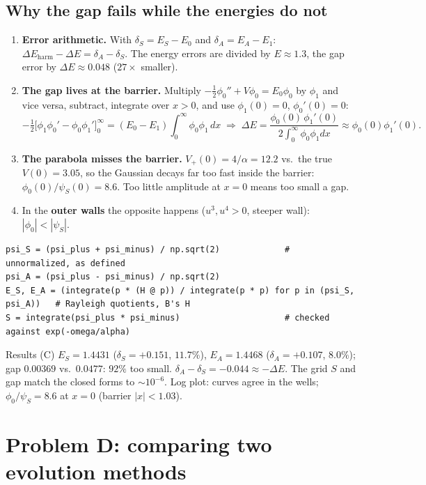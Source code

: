 \documentclass[10pt]{article}
\begin{document}
\subsection{Why the gap fails while the energies do not}
\begin{enumerate}
\item \textbf{Error arithmetic.} With $\delta_S=E_S-E_0$ and $\delta_A=E_A-E_1$: $\Delta E_\text{harm}-\Delta E=\delta_A-\delta_S$. The energy errors are divided by $E\approx1.3$, the gap error by $\Delta E\approx0.048$ ($27\times$ smaller).
\item \textbf{The gap lives at the barrier.} Multiply $-\frac12\phi_0''+V\phi_0=E_0\phi_0$ by $\phi_1$ and vice versa, subtract, integrate over $x>0$, and use $\phi_1(0)=0$, $\phi_0'(0)=0$:
\[
-\tfrac12\big[\phi_1\phi_0'-\phi_0\phi_1'\big]_0^\infty=(E_0-E_1)\int_0^\infty\phi_0\phi_1\,dx
\;\Rightarrow\;
\Delta E=\frac{\phi_0(0)\,\phi_1'(0)}{2\int_0^\infty\phi_0\phi_1dx}\approx\phi_0(0)\phi_1'(0).
\]
\item \textbf{The parabola misses the barrier.} $V_+(0)=4/\alpha=12.2$ vs.\ the true $V(0)=3.05$, so the Gaussian decays far too fast inside the barrier: $\phi_0(0)/\psi_S(0)=8.6$. Too little amplitude at $x=0$ means too small a gap.
\item In the \textbf{outer walls} the opposite happens ($u^3,u^4>0$, steeper wall): $|\phi_0|<|\psi_S|$.
\end{enumerate}
\begin{lstlisting}
psi_S = (psi_plus + psi_minus) / np.sqrt(2)             # unnormalized, as defined
psi_A = (psi_plus - psi_minus) / np.sqrt(2)
E_S, E_A = (integrate(p * (H @ p)) / integrate(p * p) for p in (psi_S, psi_A))   # Rayleigh quotients, B's H
S = integrate(psi_plus * psi_minus)                     # checked against exp(-omega/alpha)
\end{lstlisting}
\begin{resbox}{Results (C)}
$E_S=1.4431$ ($\delta_S=+0.151$, $11.7\%$), $E_A=1.4468$ ($\delta_A=+0.107$, $8.0\%$); gap $0.00369$ vs.\ $0.0477$: $92\%$ too small. $\delta_A-\delta_S=-0.044\approx-\Delta E$. The grid $S$ and gap match the closed forms to $\sim10^{-6}$. Log plot: curves agree in the wells; $\phi_0/\psi_S=8.6$ at $x=0$ (barrier $|x|<1.03$).
\end{resbox}

\section{Problem D: comparing two evolution methods}
\end{document}
